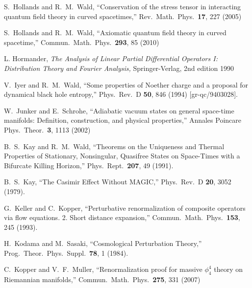 \documentclass[12pt]{article}
\theoremstyle{plain}
\theoremstyle{definition}
\begin{document}
\begin{thebibliography}{99}
 S.~Hollands and R.~M.~Wald,
  ``Conservation of the stress tensor in interacting quantum field theory in curved spacetimes,''
  Rev.\ Math.\ Phys.\  {\bf 17}, 227 (2005)

S.~Hollands and R.~M.~Wald,
  ``Axiomatic quantum field theory in curved spacetime,''
  Commun.\ Math.\ Phys.\  {\bf 293}, 85 (2010)


L. Hormander, {\em
The Analysis of Linear Partial Differential Operators I: Distribution Theory and Fourier Analysis,}
 Springer-Verlag, 2nd edition 1990

 V.~Iyer and R.~M.~Wald,
  ``Some properties of Noether charge and a proposal for dynamical black hole entropy,''
  Phys.\ Rev.\ D {\bf 50}, 846 (1994)
  [gr-qc/9403028].

 W.~Junker and E.~Schrohe,
  ``Adiabatic vacuum states on general space-time manifolds: Definition, construction, and physical properties,''
  Annales Poincare Phys.\ Theor.\  {\bf 3}, 1113 (2002)


 B.~S.~Kay and R.~M.~Wald,
  ``Theorems on the Uniqueness and Thermal Properties of Stationary, Nonsingular, Quasifree States on Space-Times with a Bifurcate Killing Horizon,''
  Phys.\ Rept.\  {\bf 207}, 49 (1991).

B.~S.~Kay,
  ``The Casimir Effect Without {MAGIC},''
  Phys.\ Rev.\ D {\bf 20}, 3052 (1979).

  G.~Keller and C.~Kopper,
  ``Perturbative renormalization of composite operators via flow equations. 2. Short distance expansion,''
  Commun.\ Math.\ Phys.\  {\bf 153}, 245 (1993).

H.~Kodama and M.~Sasaki,
  ``Cosmological Perturbation Theory,''
  Prog.\ Theor.\ Phys.\ Suppl.\  {\bf 78}, 1 (1984).

 C.~Kopper and V.~F.~Muller,
  ``Renormalization proof for massive $\phi^4_4$ theory on Riemannian manifolds,''
  Commun.\ Math.\ Phys.\  {\bf 275}, 331 (2007)





\end{thebibliography}
\end{document}
